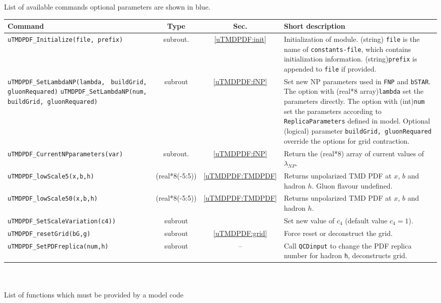 \documentclass[prd,nofootinbib,eqsecnum,final]{revtex4}
\renewcommand{\(}{\left(}
\renewcommand{\)}{\right)}
\renewcommand{\[}{\left[}
\renewcommand{\]}{\right]}
\newcommand{\blue}[1]{{\color{blue} #1}}
\begin{document}
\begin{center}
List of available commands \blue{optional parameters are shown in blue.}
\\
\begin{tabular}{||p{5.5cm}||c|c||p{8.5cm}||}
\hline\hline
Command &~~Type~~& ~~Sec.~~ & Short description
\\\hline
\texttt{uTMDPDF{\_}Initialize(file,\blue{prefix}) } & subrout. &\ref{uTMDPDF:init} & Initialization of module. (string) \texttt{file} is the name of \texttt{constants-file}, which contains initialization information. (string)\texttt{prefix} is appended to \texttt{file} if provided.
\\\hline
\texttt{uTMDPDF{\_}SetLambdaNP(lambda,} \texttt{\blue{buildGrid, gluonRequared})}
\texttt{uTMDPDF{\_}SetLambdaNP(num,} \texttt{\blue{buildGrid, gluonRequared})}
& subrout & \ref{uTMDPDF:fNP}& Set new NP parameters used in \texttt{FNP} and \texttt{bSTAR}. The option with (real*8 array)\texttt{lambda} set the parameters directly. The option with (int)\texttt{num} set the parameters according to \texttt{ReplicaParameters} defined in model. Optional (logical) parameter \texttt{buildGrid, gluonRequared} override the options for grid contraction.
\\\hline
\texttt{uTMDPDF\_CurrentNPparameters(var)} & subrout. &\ref{uTMDPDF:fNP} & Return the (real*8) array of current values of $\lambda_{NP}$.
\\\hline
\texttt{uTMDPDF{\_}lowScale5(x,b,h)} &(real*8(-5:5)) & \ref{uTMDPDF:TMDPDF} & Returns unpolarized TMD PDF at $x$, $b$ and hadron $h$. Gluon flavour undefined.
\\\hline
\texttt{uTMDPDF{\_}lowScale50(x,b,h)} &(real*8(-5:5)) & \ref{uTMDPDF:TMDPDF}&  Returns unpolarized TMD PDF at $x$, $b$ and hadron $h$.
\\\hline
\texttt{uTMDPDF{\_}SetScaleVariation(c4))}& subrout &  & Set new value of $c_4$ (default value $c_4=1$).
\\\hline
\texttt{uTMDPDF{\_}resetGrid(bG,g)}& subrout & \ref{uTMDPDF:grid}& Force reset or deconstruct the grid.
\\\hline
\texttt{uTMDPDF{\_}SetPDFreplica(num,h)}& subrout & -- & Call \texttt{QCDinput} to change the PDF replica number for hadron \texttt{h}, deconstructs grid.
\\
\hline\hline
\end{tabular}
\\
~
\\
List of functions which must be provided by a model code
\\

\end{center}
\end{document}
